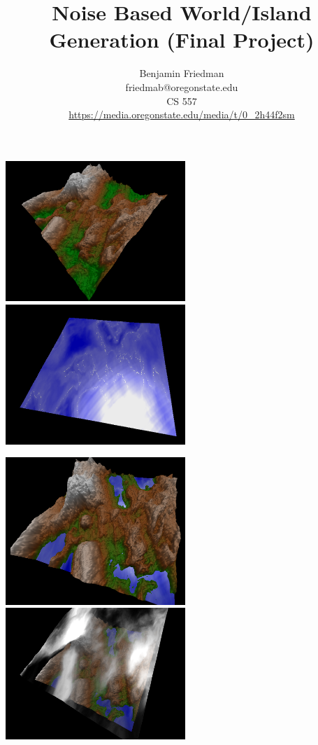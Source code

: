 \documentclass[12pt,letterpaper]{article}
\begin{document}
\title{Noise Based World/Island Generation (Final Project)}
\author{Benjamin Friedman\\
friedmab@oregonstate.edu\\
CS 557\\
\url{https://media.oregonstate.edu/media/t/0_2h44f2sm}\\
}

\maketitle

\centerline{
	\includegraphics[width=0.51\textwidth,keepaspectratio]{./p1}
	\includegraphics[width=0.51\textwidth,keepaspectratio]{./p2}
}

\centerline{
	\includegraphics[width=0.51\textwidth,keepaspectratio]{./p3}
	\includegraphics[width=0.51\textwidth,keepaspectratio]{./p7}
}
\end{document}
